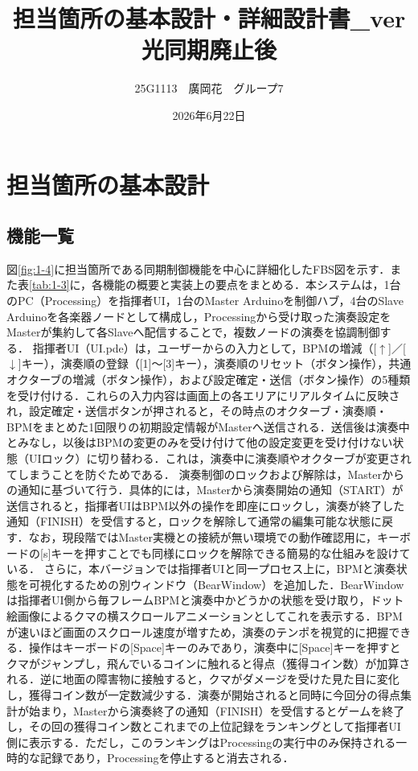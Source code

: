 \documentclass[uplatex,dvipdfmx]{jlreq}
\begin{document}
\title{担当箇所の基本設計・詳細設計書\_ver光同期廃止後}
\author{25G1113　廣岡花　グループ7}
\date{2026年6月22日}
\maketitle

\section{担当箇所の基本設計}
\subsection{機能一覧}
図\ref{fig:1-4}に担当箇所である同期制御機能を中心に詳細化したFBS図を示す．また表\ref{tab:1-3}に，各機能の概要と実装上の要点をまとめる．本システムは，1台のPC（Processing）を指揮者UI，1台のMaster Arduinoを制御ハブ，4台のSlave Arduinoを各楽器ノードとして構成し，Processingから受け取った演奏設定をMasterが集約して各Slaveへ配信することで，複数ノードの演奏を協調制御する．
指揮者UI（UI.pde）は，ユーザーからの入力として，BPMの増減（[$\uparrow$]／[$\downarrow$]キー），演奏順の登録（[1]〜[3]キー），演奏順のリセット（ボタン操作），共通オクターブの増減（ボタン操作），および設定確定・送信（ボタン操作）の5種類を受け付ける．これらの入力内容は画面上の各エリアにリアルタイムに反映され，設定確定・送信ボタンが押されると，その時点のオクターブ・演奏順・BPMをまとめた1回限りの初期設定情報がMasterへ送信される．送信後は演奏中とみなし，以後はBPMの変更のみを受け付けて他の設定変更を受け付けない状態（UIロック）に切り替わる．これは，演奏中に演奏順やオクターブが変更されてしまうことを防ぐためである．
演奏制御のロックおよび解除は，Masterからの通知に基づいて行う．具体的には，Masterから演奏開始の通知（START）が送信されると，指揮者UIはBPM以外の操作を即座にロックし，演奏が終了した通知（FINISH）を受信すると，ロックを解除して通常の編集可能な状態に戻す．なお，現段階ではMaster実機との接続が無い環境での動作確認用に，キーボードの[s]キーを押すことでも同様にロックを解除できる簡易的な仕組みを設けている．
さらに，本バージョンでは指揮者UIと同一プロセス上に，BPMと演奏状態を可視化するための別ウィンドウ（BearWindow）を追加した．BearWindowは指揮者UI側から毎フレームBPMと演奏中かどうかの状態を受け取り，ドット絵画像によるクマの横スクロールアニメーションとしてこれを表示する．BPMが速いほど画面のスクロール速度が増すため，演奏のテンポを視覚的に把握できる．操作はキーボードの[Space]キーのみであり，演奏中に[Space]キーを押すとクマがジャンプし，飛んでいるコインに触れると得点（獲得コイン数）が加算される．逆に地面の障害物に接触すると，クマがダメージを受けた見た目に変化し，獲得コイン数が一定数減少する．演奏が開始されると同時に今回分の得点集計が始まり，Masterから演奏終了の通知（FINISH）を受信するとゲームを終了し，その回の獲得コイン数とこれまでの上位記録をランキングとして指揮者UI側に表示する．ただし，このランキングはProcessingの実行中のみ保持される一時的な記録であり，Processingを停止すると消去される．
\end{document}
